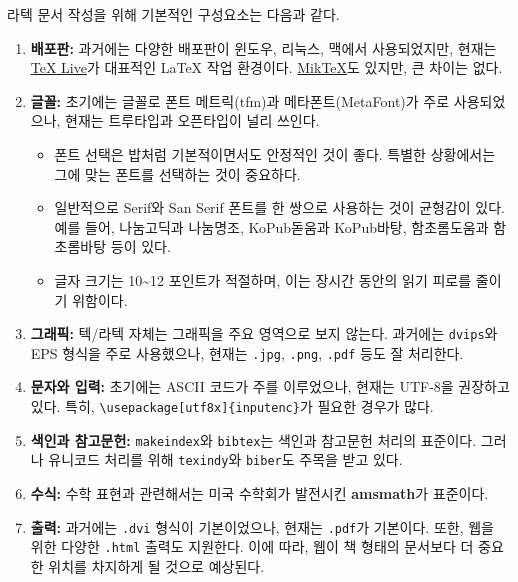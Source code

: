 \documentclass[
  letterpaper,
]{book}
\providecommand{\tightlist}{%
  \setlength{\itemsep}{0pt}\setlength{\parskip}{0pt}}\usepackage{longtable,booktabs,array}
\begin{document}
라텍 문서 작성을 위해 기본적인 구성요소는 다음과 같다.

\begin{enumerate}
\def\labelenumi{\arabic{enumi}.}
\item
  \textbf{배포판:} 과거에는 다양한 배포판이 윈도우, 리눅스, 맥에서
  사용되었지만, 현재는 \href{https://www.tug.org/texlive/}{TeX Live}가
  대표적인 LaTeX 작업 환경이다. \href{http://miktex.org/}{MikTeX}도
  있지만, 큰 차이는 없다.
\item
  \textbf{글꼴:} 초기에는 글꼴로 폰트 메트릭(tfm)과 메타폰트(MetaFont)가
  주로 사용되었으나, 현재는 트루타입과 오픈타입이 널리 쓰인다.

  \begin{itemize}
  \tightlist
  \item
    폰트 선택은 밥처럼 기본적이면서도 안정적인 것이 좋다. 특별한
    상황에서는 그에 맞는 폰트를 선택하는 것이 중요하다.
  \item
    일반적으로 Serif와 San Serif 폰트를 한 쌍으로 사용하는 것이 균형감이
    있다. 예를 들어, 나눔고딕과 나눔명조, KoPub돋움과 KoPub바탕,
    함초롬도움과 함초롬바탕 등이 있다.
  \item
    글자 크기는 10\textasciitilde12 포인트가 적절하며, 이는 장시간
    동안의 읽기 피로를 줄이기 위함이다.
  \end{itemize}
\item
  \textbf{그래픽:} 텍/라텍 자체는 그래픽을 주요 영역으로 보지 않는다.
  과거에는 \texttt{dvips}와 EPS 형식을 주로 사용했으나, 현재는
  \texttt{.jpg}, \texttt{.png}, \texttt{.pdf} 등도 잘 처리한다.
\item
  \textbf{문자와 입력:} 초기에는 ASCII 코드가 주를 이루었으나, 현재는
  UTF-8을 권장하고 있다. 특히,
  \texttt{\textbackslash{}usepackage{[}utf8x{]}\{inputenc\}}가 필요한
  경우가 많다.
\item
  \textbf{색인과 참고문헌:} \texttt{makeindex}와 \texttt{bibtex}는
  색인과 참고문헌 처리의 표준이다. 그러나 유니코드 처리를 위해
  \texttt{texindy}와 \texttt{biber}도 주목을 받고 있다.
\item
  \textbf{수식:} 수학 표현과 관련해서는 미국 수학회가 발전시킨
  \textbf{amsmath}가 표준이다.
\item
  \textbf{출력:} 과거에는 \texttt{.dvi} 형식이 기본이었으나, 현재는
  \texttt{.pdf}가 기본이다. 또한, 웹을 위한 다양한 \texttt{.html} 출력도
  지원한다. 이에 따라, 웹이 책 형태의 문서보다 더 중요한 위치를 차지하게
  될 것으로 예상된다.
\end{enumerate}
\end{document}
